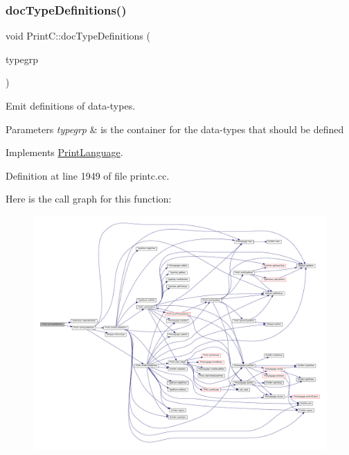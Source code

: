 \subsubsection{\texorpdfstring{docTypeDefinitions()}{docTypeDefinitions()}}
{\footnotesize\ttfamily void Print\+C\+::doc\+Type\+Definitions (\begin{DoxyParamCaption}\item[{const \mbox{\hyperlink{class_type_factory}{Type\+Factory}} $\ast$}]{typegrp }\end{DoxyParamCaption})\hspace{0.3cm}{\ttfamily [virtual]}}



Emit definitions of data-\/types. 


\begin{DoxyParams}{Parameters}
{\em typegrp} & is the container for the data-\/types that should be defined \\
\hline
\end{DoxyParams}


Implements \mbox{\hyperlink{class_print_language_aea8fdf499dc7cba307e6cf513ed0ccab}{Print\+Language}}.



Definition at line 1949 of file printc.\+cc.

Here is the call graph for this function\+:
\nopagebreak
\begin{figure}[H]
\begin{center}
\leavevmode
\includegraphics[width=350pt]{class_print_c_a6511933f0b8fd3f2fef8aa3920aa9de6_cgraph}
\end{center}
\end{figure}
\mbox{\label{class_print_c_a3ccbcccc1706e4d29930ac2fdeadc19a}} 
